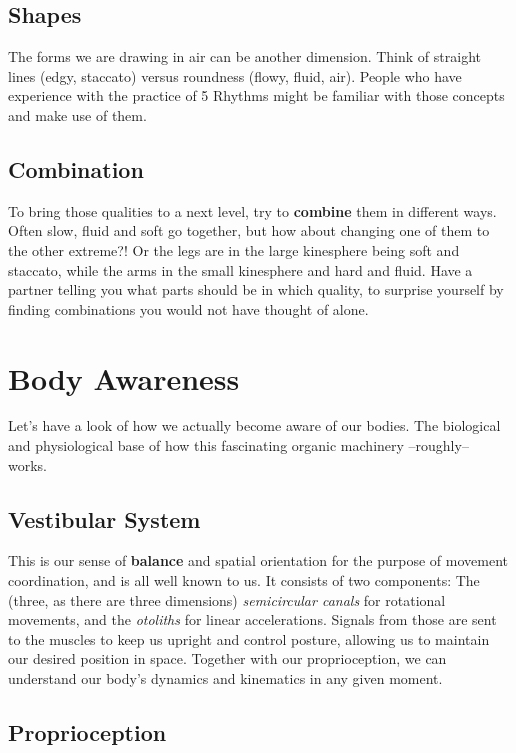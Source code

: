 \subsection{Shapes}\label{subsec:shapes}
The forms we are drawing in air can be another dimension.
Think of straight lines (edgy, staccato) versus roundness (flowy, fluid, air).
People who have experience with the practice of 5 Rhythms might be familiar with those concepts and make use of them.

\subsection{Combination}\label{subsec:combination}

To bring those qualities to a next level, try to \textbf{combine} them in different ways.
Often slow, fluid and soft go together, but how about changing one of them to the other extreme?!
Or the legs are in the large kinesphere being soft and staccato, while the arms in the small kinesphere and hard and fluid.
Have a partner telling you what parts should be in which quality, to surprise yourself by finding combinations you would not have thought of alone.

\section{Body Awareness}\label{sec:body-awareness}

Let's have a look of how we actually become aware of our bodies.
The biological and physiological base of how this fascinating organic machinery --roughly-- works.

\subsection{Vestibular System}\label{subsec:vestibular-system}

This is our sense of \textbf{balance} and spatial orientation for the purpose of movement coordination, and is all well known to us.
It consists of two components: The (three, as there are three dimensions) \textit{semicircular canals} for rotational movements, and the \textit{otoliths} for linear accelerations.
Signals from those are sent to the muscles to keep us upright and control posture, allowing us to maintain our desired position in space.
Together with our proprioception, we can understand our body's dynamics and kinematics in any given moment.

\subsection{Proprioception}\label{subsec:proprioception}

